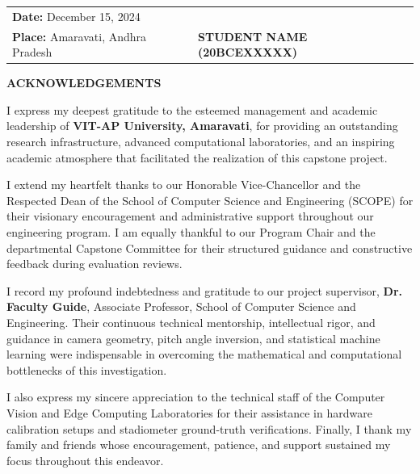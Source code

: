 \documentclass[12pt,a4paper,oneside]{report}
\begin{document}
\vspace{1.6cm}
\noindent\begin{tabular}{@{}p{}p{}@{}}
\textbf{Date:} December 15, 2024 & \\
\textbf{Place:} Amaravati, Andhra Pradesh & \textbf{STUDENT NAME (20BCEXXXXX)} \\
\end{tabular}

\clearpage
\begin{center}
{\Large\bfseries ACKNOWLEDGEMENTS\par}
\end{center}
\vspace{0.6cm}

\noindent I express my deepest gratitude to the esteemed management and academic leadership of \textbf{VIT-AP University, Amaravati}, for providing an outstanding research infrastructure, advanced computational laboratories, and an inspiring academic atmosphere that facilitated the realization of this capstone project.

\noindent I extend my heartfelt thanks to our Honorable Vice-Chancellor and the Respected Dean of the School of Computer Science and Engineering (SCOPE) for their visionary encouragement and administrative support throughout our engineering program. I am equally thankful to our Program Chair and the departmental Capstone Committee for their structured guidance and constructive feedback during evaluation reviews.

\noindent I record my profound indebtedness and gratitude to our project supervisor, \textbf{Dr. Faculty Guide}, Associate Professor, School of Computer Science and Engineering. Their continuous technical mentorship, intellectual rigor, and guidance in camera geometry, pitch angle inversion, and statistical machine learning were indispensable in overcoming the mathematical and computational bottlenecks of this investigation.

\noindent I also express my sincere appreciation to the technical staff of the Computer Vision and Edge Computing Laboratories for their assistance in hardware calibration setups and stadiometer ground-truth verifications. Finally, I thank my family and friends whose encouragement, patience, and support sustained my focus throughout this endeavor.
\end{document}
